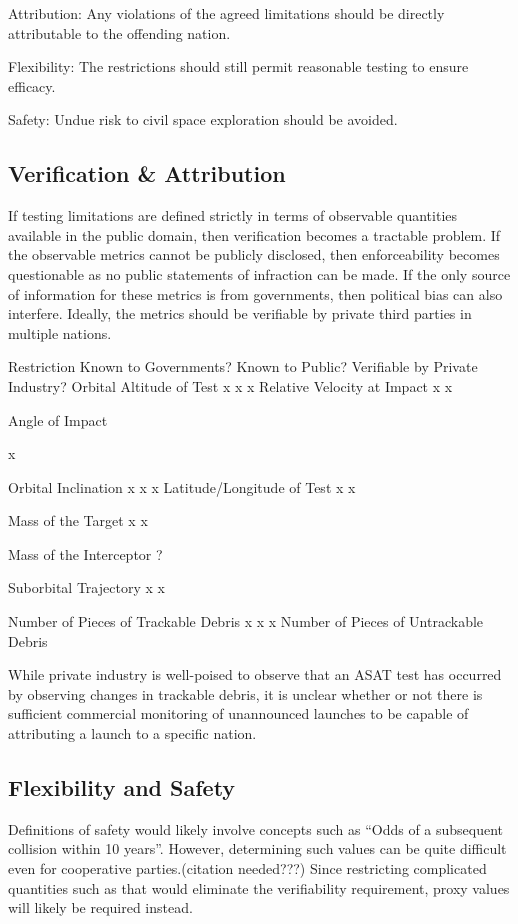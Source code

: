 Attribution: Any violations of the agreed limitations should be directly attributable to the offending nation.

Flexibility: The restrictions should still permit reasonable testing to ensure efficacy.

Safety: Undue risk to civil space exploration should be avoided.

\subsection{Verification \& Attribution}
If testing limitations are defined strictly in terms of observable quantities available in the public domain, then verification becomes a tractable problem.  If the observable metrics cannot be publicly disclosed, then enforceability becomes questionable as no public statements of infraction can be made.  If the only source of information for these metrics is from governments, then political bias can also interfere.  Ideally, the metrics should be verifiable by private third parties in multiple nations.


Restriction
Known to Governments?
Known to Public?
Verifiable by Private Industry?
Orbital Altitude of Test
x
x
x
Relative Velocity at Impact
x
x


Angle of Impact


x


Orbital Inclination
x
x
x
Latitude/Longitude of Test
x
x


Mass of the Target
x
x


Mass of the Interceptor
?




Suborbital Trajectory
x
x


Number of Pieces of Trackable Debris
x
x
x
Number of Pieces of Untrackable Debris








While private industry is well-poised to observe that an ASAT test has occurred by observing changes in trackable debris, it is unclear whether or not there is sufficient commercial monitoring of unannounced launches to be capable of attributing a launch to a specific nation.

\subsection{Flexibility and Safety}
Definitions of safety would likely involve concepts such as ``Odds of a subsequent collision within 10 years''.  However, determining such values can be quite difficult even for cooperative parties.(citation needed???)  Since restricting complicated quantities such as that would eliminate the verifiability requirement, proxy values will likely be required instead.

